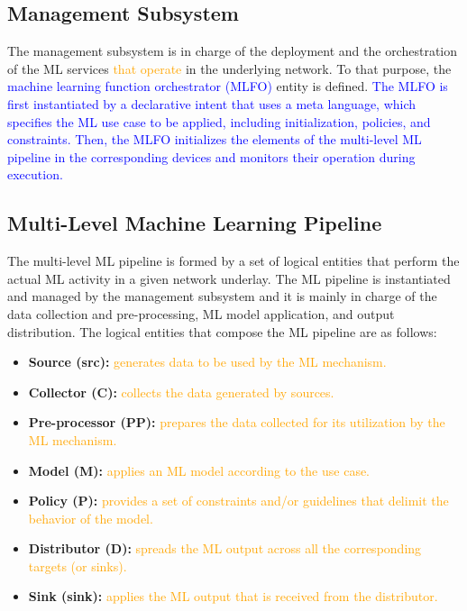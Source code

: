 \documentclass[journal]{IEEEtran}
\begin{document}
\subsection{Management Subsystem} 
The management subsystem is in charge of the deployment and the orchestration of the ML services \textcolor{orange}{that operate} in the underlying network. To that purpose, the \textcolor{blue}{machine learning function orchestrator (MLFO)} entity is defined. \textcolor{blue}{The MLFO is first instantiated by a declarative intent that uses a meta language, which specifies the ML use case to be applied, including initialization, policies, and constraints. Then, the MLFO initializes the elements of the multi-level ML pipeline in the corresponding devices and monitors their operation during execution.}

\subsection{Multi-Level Machine Learning Pipeline} 
The multi-level ML pipeline is formed by a set of logical entities that perform the actual ML activity in a given network underlay. The ML pipeline is instantiated and managed by the management subsystem and it is mainly in charge of the data collection and pre-processing, ML model application, and output distribution. The logical entities that compose the ML pipeline are as follows:
\begin{itemize}
	\item \textbf{Source (src):} \textcolor{orange}{generates data to be used by the ML mechanism.}
	\item \textbf{Collector (C):} \textcolor{orange}{collects the data generated by sources.}
	\item \textbf{Pre-processor (PP):} \textcolor{orange}{prepares the data collected for its utilization by the ML mechanism.}
	\item \textbf{Model (M):} \textcolor{orange}{applies an ML model according to the use case.}
	\item \textbf{Policy (P):} \textcolor{orange}{provides a set of constraints and/or guidelines that delimit the behavior of the model.}
	\item \textbf{Distributor (D):} \textcolor{orange}{spreads the ML output across all the corresponding targets (or sinks).}
	\item \textbf{Sink (sink):} \textcolor{orange}{applies the ML output that is received from the distributor.}
\end{itemize}
\end{document}
